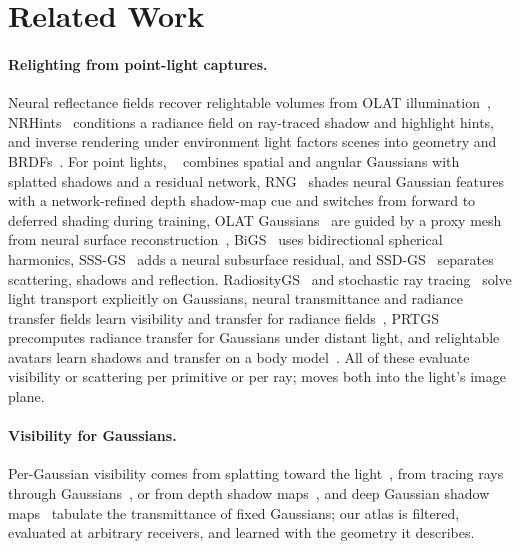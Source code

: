 \section{Related Work}
\label{sec:related}

\paragraph{Relighting from point-light captures.}
Neural reflectance fields recover relightable volumes from OLAT illumination~\cite{bi2020neural,bi2020deep}, NRHints~\cite{zeng2023nrhints} conditions a radiance field on ray-traced shadow and highlight hints, and inverse rendering under environment light factors scenes into geometry and BRDFs~\cite{srinivasan2021nerv,zhang2021nerfactor,jin2023tensoir,gao2024relightable,liang2024gsir,jiang2024gaussianshader,chen2025gigs,gu2025irgs}.
For point lights, \gsthree~\cite{bi2024gs3} combines spatial and angular Gaussians with splatted shadows and a residual network, RNG~\cite{fan2025rng} shades neural Gaussian features with a network-refined depth shadow-map cue and switches from forward to deferred shading during training, OLAT Gaussians~\cite{kuang2024olat} are guided by a proxy mesh from neural surface reconstruction~\cite{wang2021neus}, BiGS~\cite{liu2025bigs} uses bidirectional spherical harmonics, SSS-GS~\cite{dihlmann2024sss} adds a neural subsurface residual, and SSD-GS~\cite{zheng2026ssdgs} separates scattering, shadows and reflection.
RadiosityGS~\cite{jiang2025radiosity} and stochastic ray tracing~\cite{xu2026stochastic} solve light transport explicitly on Gaussians, neural transmittance and radiance transfer fields learn visibility and transfer for radiance fields~\cite{shafiei2021learning,lyu2022neural}, PRTGS~\cite{guo2024prtgs} precomputes radiance transfer for Gaussians under distant light, and relightable avatars learn shadows and transfer on a body model~\cite{bolanos2024gaussian,saito2024rgca,wang2025fullbody}.
All of these evaluate visibility or scattering per primitive or per ray; \ours moves both into the light's image plane.

\paragraph{Visibility for Gaussians.}
Per-Gaussian visibility comes from splatting toward the light~\cite{bi2024gs3,zheng2026ssdgs}, from tracing rays through Gaussians~\cite{gao2024relightable,moenne2024gaussian,gu2025irgs,xu2026stochastic}, or from depth shadow maps~\cite{fan2025rng}, and deep Gaussian shadow maps~\cite{mir2026animated} tabulate the transmittance of fixed Gaussians; our atlas is filtered, evaluated at arbitrary receivers, and learned with the geometry it describes.

